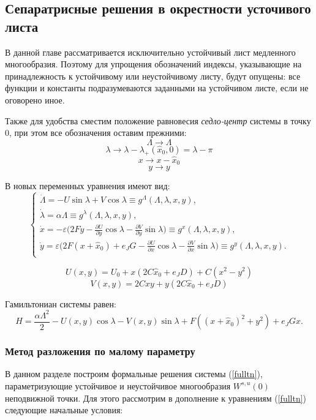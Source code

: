 \subsection{Сепаратрисные решения в окрестности усточивого листа}

    В данной главе рассматривается исключительно устойчивый лист медленного многообразия. Поэтому для упрощения обозначений индексы, указывающие на принадлежность к устойчивому или неустойчивому листу, будут опущены: все функции и константы подразумеваются заданными на устойчивом листе, если не оговорено иное.

Также для удобства сместим положение равновесия \textit{седло-центр} системы в точку $0$, при этом все обозначения оставим прежними:
$$\Lambda \rightarrow \Lambda$$
$$\lambda \rightarrow \lambda - \lambda_+(\hat x_0,0) = \lambda - \pi$$
$$x \rightarrow x - \hat x_0$$
$$y \rightarrow y$$

В новых переменных уравнения имеют вид:
\begin{equation}
    \begin{cases}
        \dot \Lambda = - U \sin \lambda + V \cos \lambda \equiv g^\Lambda(\Lambda,\lambda,x,y), \\
        \dot \lambda = \alpha \Lambda \equiv g^\lambda(\Lambda,\lambda,x,y), \\
        \dot x = -\varepsilon \big( 2Fy-\frac{\partial U}{\partial y} \cos \lambda - \frac{\partial V}{\partial y} \sin \lambda \big) \equiv g^x(\Lambda,\lambda,x,y), \\
        \dot y = \varepsilon \big( 2F(x+\hat x_0)+e_JG -\frac{\partial U}{\partial x} \cos \lambda - \frac{\partial V}{\partial x} \sin \lambda \big) \equiv g^y(\Lambda,\lambda,x,y). \\
    \end{cases}
    \label{fulltn}
\end{equation}

$$U(x,y) = U_0 + x(2C \hat x_0+e_JD)+C(x^2-y^2)$$
$$V(x,y) = 2Cxy+y(2C \hat x_0+e_JD)$$

Гамильтониан системы равен:
\begin{equation}
H = \frac{\alpha \Lambda^2}{2} - U(x,y)\cos{\lambda} - V(x,y)\sin{\lambda} + F \left((x+\hat x_0)^2+y^2 \right) + e_J G x. 
\label{H}
\end{equation}

\subsubsection{Метод разложения по малому параметру}
    В данном разделе построим формальные решения системы (\ref{fulltn}), параметризующие устойчивое и неустойчивое многообразия $W^{s,u}(0)$ неподвижной точки. Для этого рассмотрим в дополнение к уравнениям (\ref{fulltn}) следующие начальные условия:
    
